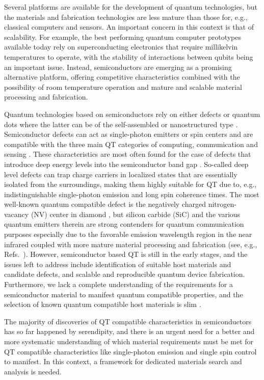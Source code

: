 \documentclass[superscriptaddress,unsortedaddress,
 amsmath,amssymb,
 aps,
]{revtex4-2}
\begin{document}
Several platforms are available for the development of quantum technologies, but the materials and fabrication technologies are less mature than those for, e.g., classical computers and sensors. 
An important concern in this context is that of scalability. 
For example, the best performing quantum computer prototypes available today rely on superconducting electronics that require millikelvin temperatures to operate, with the stability of interactions between qubits being an important issue. Instead, semiconductors are emerging as a promising alternative platform, offering competitive characteristics combined with the possibility of room temperature operation and mature and scalable material processing and fabrication.  

Quantum technologies based on semiconductors rely on either defects or quantum dots where the latter can be of the self-assembled or nanostructured type \cite{Aharonovich_2016}. 
Semiconductor defects can act as single-photon emitters or spin centers and are compatible with the three main QT categories of computing, communication and sensing \cite{Awschalom_2018}. 
These characteristics are most often found for the case of defects that introduce deep energy levels into the semiconductor band gap \cite{Weber2010}. So-called deep level defects can trap charge carriers in localized states that are essentially isolated from the surroundings, making them highly suitable for QT due to, e.g., indistinguishable single-photon emission and long spin coherence times. 
The most well-known quantum compatible defect is the negatively charged nitrogen-vacancy (NV) center in diamond \cite{Doherty_2013}, but silicon carbide (SiC) and the various quantum emitters therein are strong contenders for quantum communication purposes especially due to the favorable emission wavelength region in the near infrared coupled with more mature material processing and fabrication (see, e.g., Refs.~\cite{Castelletto_2015,Son2020,Bathen2021}). 
However, semiconductor based QT is still in the early stages, and the issues left to address include identification of suitable host materials and candidate defects, and scalable and reproducible quantum device fabrication. 
Furthermore, we lack a complete understanding of the requirements for a semiconductor material to manifest quantum compatible properties,  
and the selection of known quantum compatible host materials is slim \cite{Atatuere2018,Zhang2020}. 

The majority of discoveries of QT compatible characteristics in semiconductors has so far happened by serendipity, and there is an urgent need for a better and more systematic understanding of which material requirements must be met for QT compatible characteristics like single-photon emission and single spin control to manifest. In this context, a framework for dedicated materials search and analysis is needed. 
\end{document}
